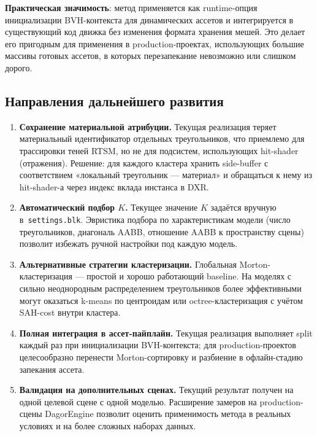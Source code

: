 \textbf{Практическая значимость}: метод применяется как
runtime-опция инициализации BVH-контекста для динамических
ассетов и интегрируется в существующий код движка без изменения
формата хранения мешей. Это делает его пригодным для применения
в production-проектах, использующих большие массивы готовых
ассетов, в которых перезапекание невозможно или слишком дорого.

\subsection{Направления дальнейшего развития}

\begin{enumerate}
    \item \textbf{Сохранение материальной атрибуции.} Текущая
      реализация теряет материальный идентификатор отдельных
      треугольников, что приемлемо для трассировки теней RTSM,
      но не для подсистем, использующих hit-shader (отражения). Решение: для каждого кластера хранить
      side-buffer с соответствием «локальный треугольник --- материал»
      и обращаться к нему из hit-shader-а через
      индекс вклада инстанса в DXR.
    \item \textbf{Автоматический подбор $K$.} Текущее значение
      $K$ задаётся вручную в~\texttt{settings.blk}.
      Эвристика подбора по характеристикам модели (число
      треугольников, диагональ AABB, отношение AABB к
      пространству сцены) позволит избежать ручной настройки
      под каждую модель.
    \item \textbf{Альтернативные стратегии кластеризации.}
      Глобальная Morton-кластеризация --- простой и хорошо
      работающий baseline. На моделях с сильно неоднородным
      распределением треугольников более эффективными могут
      оказаться k-means по центроидам или octree-кластеризация
      с учётом SAH-cost внутри кластера.
    \item \textbf{Полная интеграция в ассет-пайплайн.} Текущая
      реализация выполняет split каждый раз при инициализации
      BVH-контекста; для production-проектов целесообразно
      перенести Morton-сортировку и разбиение в офлайн-стадию
      запекания ассета.
    \item \textbf{Валидация на дополнительных сценах.} Текущий
      результат получен на одной целевой сцене с одной моделью.
      Расширение замеров на production-сцены DagorEngine
      позволит оценить применимость метода в
      реальных условиях и на более сложных наборах данных.
\end{enumerate}

